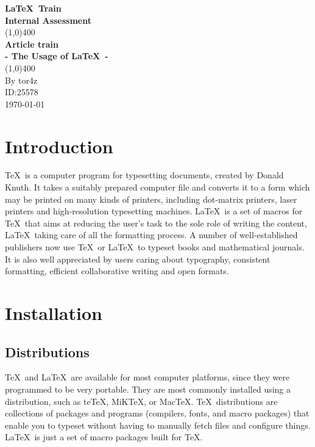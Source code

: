 \documentclass[11pt]{article}
\begin{document}
\begin{titlepage}
\begin{center}
\vspace*{1cm}
\Large{\textbf{\LaTeX\ Train}}\\
\Large{\textbf{Internal Assessment}}\\
\vfill
\line(1,0){400}\\[1mm]
\huge{\textbf{Article train}}\\[3mm]
\Large{\textbf{- The Usage of \LaTeX\ -}}\\[1mm]
\line(1,0){400}\\
\vfill
By tor4z \\
ID:25578 \\
\today
\end{center}
\end{titlepage}

\tableofcontents
\thispagestyle{empty}
\clearpage

\setcounter{page}{1}


\section{Introduction}

\TeX\ is a computer program for typesetting documents, created by Donald Knuth. It takes a suitably prepared computer file and converts it to a form which may be printed on many kinds of printers, including dot-matrix printers, laser printers and high-resolution typesetting machines. \LaTeX\ is a set of macros for \TeX\ that aims at reducing the user's task to the sole role of writing the content, \LaTeX\ taking care of all the formatting process. A number of well-established publishers now use \TeX\ or \LaTeX\ to typeset books and mathematical journals. It is also well appreciated by users caring about typography, consistent formatting, efficient collaborative writing and open formats\cite{WIKI1}.

\section{Installation}
\subsection{Distributions}

\TeX\ and \LaTeX\ are available for most computer platforms, since they were programmed to be very portable. They are most commonly installed using a distribution, such as teTeX, MiKTeX, or MacTeX. \TeX\ distributions are collections of packages and programs (compilers, fonts, and macro packages) that enable you to typeset without having to manually fetch files and configure things. \LaTeX\ is just a set of macro packages built for \TeX .
\end{document}
